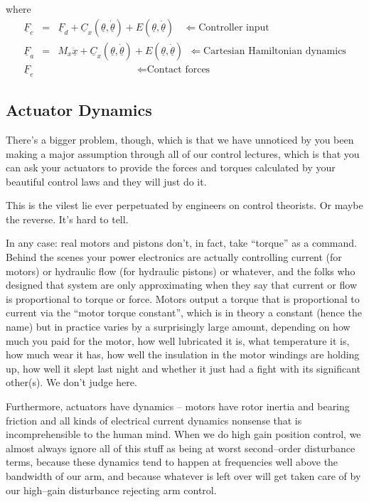 \documentclass[]{article}
\begin{document}
where
\begin{eqnarray}
 \underline{F}_{c} & = & \underline{F}_{d} + \underline{C}_{x}(\underline{\theta}, \underline{\dot{\theta}}) + E(\underline{\theta}, \underline{\dot{\theta}})\ \ \ \  \Leftarrow \text{Controller input}\nonumber \\
 \underline{F}_{a} & = & M_{x}\underline{\ddot{x}} + \underline{C}_{x}(\underline{\theta}, \underline{\dot{\theta}}) + E(\underline{\theta}, \underline{\dot{\theta}})\ \  \Leftarrow \text{Cartesian Hamiltonian dynamics} \nonumber \\
 \underline{F}_{e} &&\ \ \ \ \ \ \ \ \ \ \ \ \ \ \ \ \ \ \ \ \ \ \ \ \ \ \ \ \ \ \ \ \ \ \ \ \Leftarrow \text{Contact forces} \nonumber
\end{eqnarray}

\subsection{Actuator Dynamics}
There's a bigger problem, though, which is that we have unnoticed by you been making a major assumption through all of our control lectures, which is that you can ask your actuators to provide the forces and torques calculated by your beautiful control laws and they will just do it.

This is the vilest lie ever perpetuated by engineers on control theorists. Or maybe the reverse. It's hard to tell.

In any case: real motors and pistons don't, in fact, take ``torque'' as a command. Behind the scenes your power electronics are actually controlling current (for motors) or hydraulic flow (for hydraulic pistons) or whatever, and the folks who designed that system are only approximating when they say that current or flow is proportional to torque or force. Motors output a torque that is proportional to current via the ``motor torque constant'', which is in theory a constant (hence the name) but in practice varies by a surprisingly large amount, depending on how much you paid for the motor, how well lubricated it is, what temperature it is, how much wear it has, how well the insulation in the motor windings are holding up, how well it slept last night and whether it just had a fight with its significant other(s). We don't judge here.

Furthermore, actuators have dynamics -- motors have rotor inertia and bearing friction and all kinds of electrical current dynamics nonsense that is incomprehensible to the human mind. When we do high gain position control, we almost always ignore all of this stuff as being at worst second--order disturbance terms, because these dynamics tend to happen at frequencies well above the bandwidth of our arm, and because whatever is left over will get taken care of by our high--gain disturbance rejecting arm control.
\end{document}
